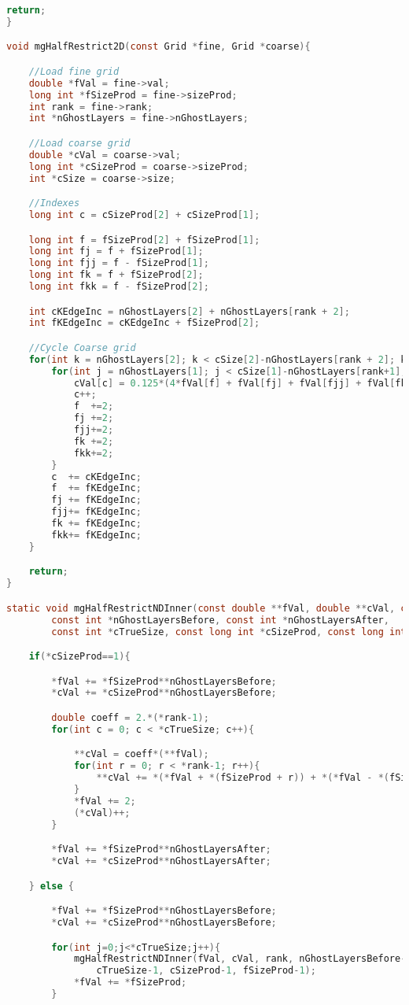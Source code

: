 \begin{lstlisting}[language=c, caption = main routine]
	return;
}

void mgHalfRestrict2D(const Grid *fine, Grid *coarse){

	//Load fine grid
	double *fVal = fine->val;
	long int *fSizeProd = fine->sizeProd;
	int rank = fine->rank;
	int *nGhostLayers = fine->nGhostLayers;

	//Load coarse grid
	double *cVal = coarse->val;
	long int *cSizeProd = coarse->sizeProd;
	int *cSize = coarse->size;

	//Indexes
	long int c = cSizeProd[2] + cSizeProd[1];

	long int f = fSizeProd[2] + fSizeProd[1];
	long int fj = f + fSizeProd[1];
	long int fjj = f - fSizeProd[1];
	long int fk = f + fSizeProd[2];
	long int fkk = f - fSizeProd[2];

	int cKEdgeInc = nGhostLayers[2] + nGhostLayers[rank + 2];
	int fKEdgeInc = cKEdgeInc + fSizeProd[2];

	//Cycle Coarse grid
	for(int k = nGhostLayers[2]; k < cSize[2]-nGhostLayers[rank + 2]; k++){
		for(int j = nGhostLayers[1]; j < cSize[1]-nGhostLayers[rank+1]; j++){
			cVal[c] = 0.125*(4*fVal[f] + fVal[fj] + fVal[fjj] + fVal[fk] + fVal[fkk]);
			c++;
			f  +=2;
			fj +=2;
			fjj+=2;
			fk +=2;
			fkk+=2;
		}
		c  += cKEdgeInc;
		f  += fKEdgeInc;
		fj += fKEdgeInc;
		fjj+= fKEdgeInc;
		fk += fKEdgeInc;
		fkk+= fKEdgeInc;
	}

	return;
}

static void mgHalfRestrictNDInner(const double **fVal, double **cVal, const int *rank,
		const int *nGhostLayersBefore, const int *nGhostLayersAfter,
		const int *cTrueSize, const long int *cSizeProd, const long int *fSizeProd){

	if(*cSizeProd==1){

		*fVal += *fSizeProd**nGhostLayersBefore;
		*cVal += *cSizeProd**nGhostLayersBefore;

		double coeff = 2.*(*rank-1);
		for(int c = 0; c < *cTrueSize; c++){

			**cVal = coeff*(**fVal);
			for(int r = 0; r < *rank-1; r++){
				**cVal += *(*fVal + *(fSizeProd + r)) + *(*fVal - *(fSizeProd + r));
			}
			*fVal += 2;
			(*cVal)++;
		}

		*fVal += *fSizeProd**nGhostLayersAfter;
		*cVal += *cSizeProd**nGhostLayersAfter;

	} else {

		*fVal += *fSizeProd**nGhostLayersBefore;
		*cVal += *cSizeProd**nGhostLayersBefore;

		for(int j=0;j<*cTrueSize;j++){
			mgHalfRestrictNDInner(fVal, cVal, rank, nGhostLayersBefore-1, nGhostLayersAfter-1,
				cTrueSize-1, cSizeProd-1, fSizeProd-1);
			*fVal += *fSizeProd;
		}


\end{lstlisting}
